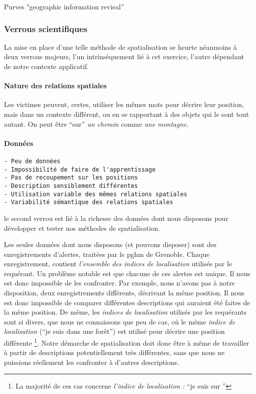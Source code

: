 Purves "geographic information revieal''

\subsubsection{Verrous scientifiques}

La mise en place d'une telle méthode de spatialisation se heurte
néanmoins à deux verrous majeurs, l'un intrinsèquement lié à cet
exercice, l'autre dépendant de notre contexte applicatif.

\paragraph{Nature des relations spatiales}

Les victimes peuvent, certes, utiliser les mêmes mots pour décrire
leur position, mais dans un contexte différent, ou en se rapportant à
des objets qui le sont tout autant. On peut être \enquote{sur}
\emph{un chemin} comme \emph{une montagne.}

\paragraph{Données}

\begin{verbatim}
- Peu de données
- Impossibilité de faire de l'apprentissage
- Pas de recoupement sur les positions
- Description sensiblement différentes
- Utilisation variable des mêmes relations spatiales
- Variabilité sémantique des relations spatiales
\end{verbatim}

le second verrou est lié à la richesse des données dont nous disposons
pour développer et tester nos méthodes de spatialisation.

Les seules données dont nous disposons (et pouvons disposer) sont des
enregistrements d'alertes, traitées par le \ac{pghm} de
Grenoble. Chaque enregistrement, contient \emph{l'ensemble des indices
  de localisation} utilisés par le requérant. Un problème notable est
que chacune de ces alertes est unique. Il nous est donc impossible de
les confronter.
Par exemple, nous n'avons pas à notre disposition, deux
enregistrements différents, décrivant la même position. Il nous est
donc impossible de comparer différentes descriptions qui auraient été
faites de la même position. De même, les \emph{indices de
  localisation} utilisés par les requérants sont si divers, que nous
ne connaissons que peu de cas, où le même \emph{indice de
  localisation} (\eg \enquote{je suis dans une forêt}) est utilisé
pour décrire une position différente \footnote{La majorité de ces cas
  concerne \emph{l'indice de localisation :} \enquote{je suis sur
    }}. Notre
démarche de spatialisation doit donc être à même de travailler à
partir de descriptions potentiellement très différentes, sans que nous
ne puissions réellement les confronter à d'autres descriptions.

